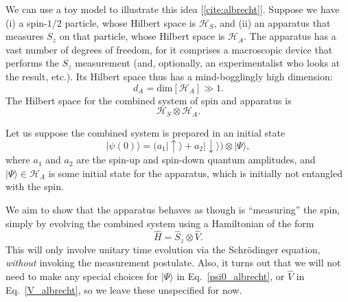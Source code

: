 \documentclass[prx,12pt]{revtex4-2}
\begin{document}
We can use a toy model to illustrate this idea [\ref{cite:albrecht}].
Suppose we have (i) a spin-$1/2$ particle, whose Hilbert space is
$\mathscr{H}_S$, and (ii) an apparatus that measures $S_z$ on that
particle, whose Hilbert space is $\mathscr{H}_A$.  The apparatus has a
vast number of degrees of freedom, for it comprises a macroscopic
device that performs the $S_z$ measurement (and, optionally, an
experimentalist who looks at the result, etc.).  Its Hilbert space
thus has a mind-bogglingly high dimension:
\begin{equation}
  d_A = \mathrm{dim}[\mathscr{H}_A] \gg 1.
\end{equation}
The Hilbert space for the combined system of spin and apparatus is
\begin{equation}
  \mathscr{H}_S \otimes \mathscr{H}_A.
\end{equation}

Let us suppose the combined system is prepared in an initial state
\begin{equation}
  |\psi(0)\rangle = \Big(a_1 |\!\uparrow\rangle + a_2 |\!\downarrow\rangle\Big) \otimes |\Psi\rangle,
  \label{psi0_albrecht}
\end{equation}
where $a_1$ and $a_2$ are the spin-up and spin-down quantum
amplitudes, and $|\Psi\rangle \in \mathscr{H}_A$ is some initial state
for the apparatus, which is initially not entangled with the spin.

We aim to show that the apparatus behaves as though is ``measuring''
the spin, simply by evolving the combined system using a Hamiltonian
of the form
\begin{equation}
  \hat{H} = \hat{S}_z \otimes \hat{V}.
  \label{V_albrecht}
\end{equation}
This will only involve unitary time evolution via the Schr\"odinger
equation, \textit{without} invoking the measurement postulate.  Also,
it turns out that we will not need to make any special choices for
$|\Psi\rangle$ in Eq.~\eqref{psi0_albrecht}, or $\hat{V}$ in
Eq.~\eqref{V_albrecht}, so we leave these unspecified for now.
\end{document}
